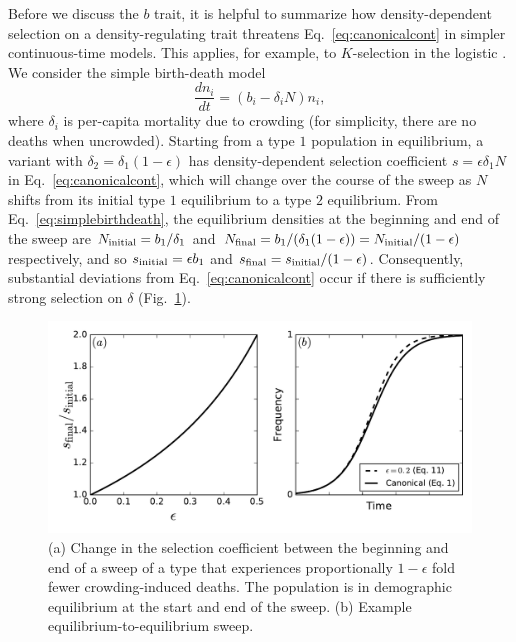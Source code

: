 \documentclass[12pt]{article}
\begin{document}
Before we discuss the $b$ trait, it is helpful to summarize how density-dependent selection on a density-regulating trait threatens Eq.~\eqref{eq:canonicalcont} in simpler continuous-time models. This applies, for example, to $K$-selection in the logistic \citep{kimura1969natural,crow_1970}. We consider the simple birth-death model \citep{kostitzin_1939} 
\begin{equation}
\frac{d n_i}{dt}=(b_i -\delta_iN) n_i, \label{eq:simplebirthdeath}
\end{equation}
where $\delta_i$ is per-capita mortality due to crowding (for simplicity, there are no deaths when uncrowded). Starting from a type $1$ population in equilibrium, a variant with $\delta_2=\delta_1(1-\epsilon)$ has density-dependent selection coefficient $s=\epsilon \delta_1 N$ in Eq.~\eqref{eq:canonicalcont}, which will change over the course of the sweep as $N$ shifts from its initial type $1$ equilibrium to a type $2$ equilibrium. From Eq.~\eqref{eq:simplebirthdeath}, the equilibrium densities at the beginning and end of the sweep are $N_{\rm initial}=b_1/\delta_1$ and $N_{\rm final}=b_1/(\delta_1(1-\epsilon))=N_{\rm initial}/(1-\epsilon)$ respectively, and so $s_{\rm initial}= \epsilon b_1$ and $s_{\rm final}=s_{\rm initial}/(1-\epsilon)$. Consequently, substantial deviations from Eq.~\eqref{eq:canonicalcont} occur if there is sufficiently strong selection on $\delta$ (Fig.~\ref{fig:strengthofselection}).

\begin{figure}
\centering
\includegraphics[scale=0.8]{strengthofselection.pdf}
\caption{\label{fig:strengthofselection} (a) Change in the selection coefficient between the beginning and end of a sweep of a type that experiences proportionally $1-\epsilon$ fold fewer crowding-induced deaths. The population is in demographic equilibrium at the start and end of the sweep. (b) Example equilibrium-to-equilibrium sweep.}
\end{figure}
\end{document}
